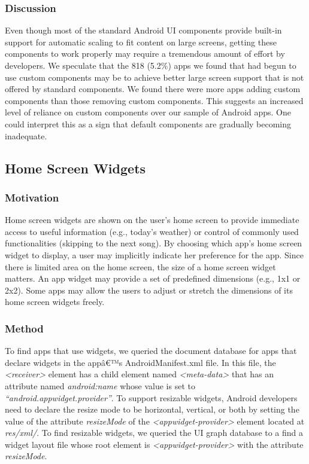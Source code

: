 \subsubsection{Discussion}

Even though most of the standard Android UI components provide built-in support for automatic scaling to fit content on large screens, getting these components to work properly may require a tremendous amount of effort by developers.
We speculate that the 818 (5.2\%) apps we found that had begun to use custom components may be to achieve better large screen support that is not offered by standard components.
We found there were more apps adding custom components than those removing custom components.
This suggests an increased level of reliance on custom components over our sample of Android apps.
One could interpret this as a sign that default components are gradually becoming inadequate.

\subsection{Home Screen Widgets}

\subsubsection{Motivation}

Home screen widgets are shown on the user's home screen to provide immediate access to useful information (e.g., today's weather) or control of commonly used functionalities (skipping to the next song).
By choosing which app's home screen widget to display, a user may implicitly indicate her preference for the app. 
Since there is limited area on the home screen, the size of a home screen widget matters. 
An app widget may provide a set of predefined dimensions (e.g., 1x1 or 2x2). 
Some apps may allow the users to adjust or stretch the dimensions of its home screen widgets freely.

\subsubsection{Method}

To find apps that use widgets, we queried the document database for apps that declare widgets in the appâ€™s AndroidManifest.xml file. 
In this file, the \textit{\textless receiver\textgreater} element has a child element named \textit{\textless meta-data\textgreater} that has an attribute named \textit{android:name} whose value is set to \textit{``android.appwidget.provider''}. 
To support resizable widgets, Android developers need to declare the resize mode to be horizontal, vertical, or both by setting the value of the attribute \textit{resizeMode} of the \textit{\textless appwidget-provider\textgreater} element located at \textit{res/xml/}. 
To find resizable widgets, we queried the UI graph database to a find a widget layout file whose root element is \textit{\textless appwidget-provider\textgreater} with the attribute \textit{resizeMode}.

